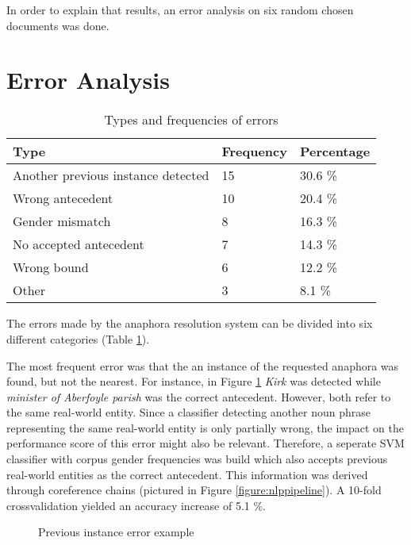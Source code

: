 In order to explain that results, an error analysis on six random chosen documents was done.

\section{Error Analysis}
\begin{table}[h]
\centering
  \caption{Types and frequencies of errors}
\begin{tabular}{|l|l|l|}
	\hline
	Type & Frequency & Percentage \\ \hline
	\hline
	Another previous instance detected & 15 & 30.6 \% \\ \hline
	Wrong antecedent & 10 & 20.4 \% \\ \hline
	Gender mismatch & 8 & 16.3 \% \\ \hline
	No accepted antecedent & 7 & 14.3 \% \\ \hline
	Wrong bound & 6 & 12.2 \% \\ \hline
	Other & 3 & 8.1 \% \\ \hline
	\end{tabular}

     \label{table:errorFreq}
\end{table}

The errors made by the anaphora resolution system can be divided into six different categories (Table \ref{table:errorFreq}).


The most frequent error was that the an instance of the requested anaphora was found, but not the nearest. For instance, in Figure \ref{figure:prevInstError} \textit{Kirk} was detected while \textit{minister of Aberfoyle parish} was the correct antecedent. However, both refer to the same real-world entity. Since a classifier detecting another noun phrase representing the same real-world entity is only partially wrong, the impact on the performance score of this error might also be relevant. Therefore, a seperate SVM classifier with corpus gender frequencies was build which also accepts previous real-world entities as the correct antecedent. This information was derived through coreference chains (pictured in Figure \ref{figure:nlppipeline}). A 10-fold crossvalidation yielded an accuracy increase of 5.1 \%.

\begin{figure}[h]
\centering
\caption{Previous instance error example}
	\label{figure:prevInstError}
\end{figure}

